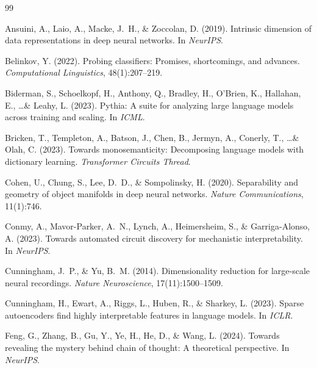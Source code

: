 \documentclass[11pt,twocolumn]{article}
\begin{document}
\begin{thebibliography}{99}

Ansuini, A., Laio, A., Macke, J.~H., \& Zoccolan, D. (2019).
\newblock Intrinsic dimension of data representations in deep neural networks.
\newblock In \emph{NeurIPS}.

Belinkov, Y. (2022).
\newblock Probing classifiers: Promises, shortcomings, and advances.
\newblock \emph{Computational Linguistics}, 48(1):207--219.

Biderman, S., Schoelkopf, H., Anthony, Q., Bradley, H., O'Brien, K., Hallahan, E., \ldots \& Leahy, L. (2023).
\newblock Pythia: A suite for analyzing large language models across training and scaling.
\newblock In \emph{ICML}.

Bricken, T., Templeton, A., Batson, J., Chen, B., Jermyn, A., Conerly, T., \ldots \& Olah, C. (2023).
\newblock Towards monosemanticity: Decomposing language models with dictionary learning.
\newblock \emph{Transformer Circuits Thread}.

Cohen, U., Chung, S., Lee, D.~D., \& Sompolinsky, H. (2020).
\newblock Separability and geometry of object manifolds in deep neural networks.
\newblock \emph{Nature Communications}, 11(1):746.

Conmy, A., Mavor-Parker, A.~N., Lynch, A., Heimersheim, S., \& Garriga-Alonso, A. (2023).
\newblock Towards automated circuit discovery for mechanistic interpretability.
\newblock In \emph{NeurIPS}.

Cunningham, J.~P., \& Yu, B.~M. (2014).
\newblock Dimensionality reduction for large-scale neural recordings.
\newblock \emph{Nature Neuroscience}, 17(11):1500--1509.

Cunningham, H., Ewart, A., Riggs, L., Huben, R., \& Sharkey, L. (2023).
\newblock Sparse autoencoders find highly interpretable features in language models.
\newblock In \emph{ICLR}.

Feng, G., Zhang, B., Gu, Y., Ye, H., He, D., \& Wang, L. (2024).
\newblock Towards revealing the mystery behind chain of thought: A theoretical perspective.
\newblock In \emph{NeurIPS}.


\end{thebibliography}
\end{document}
